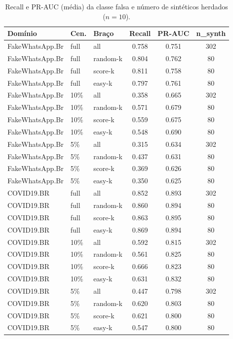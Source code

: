 \documentclass[conference]{IEEEtran}
\begin{document}
\begin{table}[t]
\caption{Recall e PR-AUC (m\'edia) da classe falsa e n\'umero de sint\'eticos herdados ($n{=}10$).}\label{tab:aux}
\centering
\footnotesize
\setlength{\tabcolsep}{6pt}
\begin{tabular}{@{}lllccc@{}}
\toprule
Dom\'inio & Cen. & Bra\c{c}o & Recall & PR-AUC & n\_synth \\
\midrule
FakeWhatsApp.Br & full & all & 0.758 & 0.751 & 302 \\
FakeWhatsApp.Br & full & random-k & 0.804 & 0.762 & 80 \\
FakeWhatsApp.Br & full & score-k & 0.811 & 0.758 & 80 \\
FakeWhatsApp.Br & full & easy-k & 0.797 & 0.761 & 80 \\
FakeWhatsApp.Br & 10\% & all & 0.358 & 0.665 & 302 \\
FakeWhatsApp.Br & 10\% & random-k & 0.571 & 0.679 & 80 \\
FakeWhatsApp.Br & 10\% & score-k & 0.559 & 0.675 & 80 \\
FakeWhatsApp.Br & 10\% & easy-k & 0.548 & 0.690 & 80 \\
FakeWhatsApp.Br & 5\% & all & 0.315 & 0.634 & 302 \\
FakeWhatsApp.Br & 5\% & random-k & 0.437 & 0.631 & 80 \\
FakeWhatsApp.Br & 5\% & score-k & 0.369 & 0.626 & 80 \\
FakeWhatsApp.Br & 5\% & easy-k & 0.350 & 0.625 & 80 \\
COVID19.BR & full & all & 0.852 & 0.893 & 302 \\
COVID19.BR & full & random-k & 0.860 & 0.894 & 80 \\
COVID19.BR & full & score-k & 0.863 & 0.895 & 80 \\
COVID19.BR & full & easy-k & 0.869 & 0.894 & 80 \\
COVID19.BR & 10\% & all & 0.592 & 0.815 & 302 \\
COVID19.BR & 10\% & random-k & 0.561 & 0.825 & 80 \\
COVID19.BR & 10\% & score-k & 0.666 & 0.823 & 80 \\
COVID19.BR & 10\% & easy-k & 0.631 & 0.832 & 80 \\
COVID19.BR & 5\% & all & 0.447 & 0.798 & 302 \\
COVID19.BR & 5\% & random-k & 0.620 & 0.803 & 80 \\
COVID19.BR & 5\% & score-k & 0.621 & 0.800 & 80 \\
COVID19.BR & 5\% & easy-k & 0.547 & 0.800 & 80 \\

\end{tabular}
\end{table}
\end{document}
